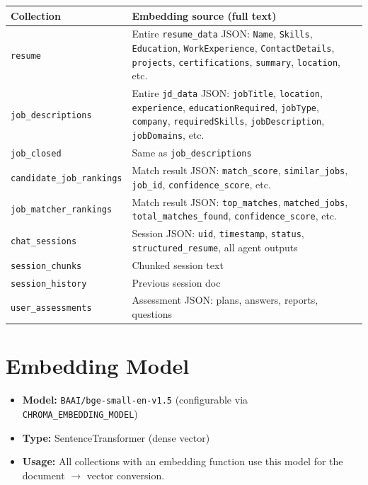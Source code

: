 \documentclass[11pt]{article}
\begin{document}
\begin{table}[h]
\centering
\begin{tabular}{@{}p{3.5cm}p{10cm}@{}}
\toprule
\textbf{Collection} & \textbf{Embedding source (full text)} \\
\midrule
\texttt{resume} & Entire \texttt{resume\_data} JSON: \texttt{Name}, \texttt{Skills}, \texttt{Education}, \texttt{WorkExperience}, \texttt{ContactDetails}, \texttt{projects}, \texttt{certifications}, \texttt{summary}, \texttt{location}, etc. \\
\midrule
\texttt{job\_descriptions} & Entire \texttt{jd\_data} JSON: \texttt{jobTitle}, \texttt{location}, \texttt{experience}, \texttt{educationRequired}, \texttt{jobType}, \texttt{company}, \texttt{requiredSkills}, \texttt{jobDescription}, \texttt{jobDomains}, etc. \\
\midrule
\texttt{job\_closed} & Same as \texttt{job\_descriptions} \\
\midrule
\texttt{candidate\_job\_rankings} & Match result JSON: \texttt{match\_score}, \texttt{similar\_jobs}, \texttt{job\_id}, \texttt{confidence\_score}, etc. \\
\midrule
\texttt{job\_matcher\_rankings} & Match result JSON: \texttt{top\_matches}, \texttt{matched\_jobs}, \texttt{total\_matches\_found}, \texttt{confidence\_score}, etc. \\
\midrule
\texttt{chat\_sessions} & Session JSON: \texttt{uid}, \texttt{timestamp}, \texttt{status}, \texttt{structured\_resume}, all agent outputs \\
\midrule
\texttt{session\_chunks} & Chunked session text \\
\midrule
\texttt{session\_history} & Previous session doc \\
\midrule
\texttt{user\_assessments} & Assessment JSON: plans, answers, reports, questions \\
\bottomrule
\end{tabular}
\end{table}

\section{Embedding Model}

\begin{itemize}
\item \textbf{Model:} \texttt{BAAI/bge-small-en-v1.5} (configurable via \texttt{CHROMA\_EMBEDDING\_MODEL})
\item \textbf{Type:} SentenceTransformer (dense vector)
\item \textbf{Usage:} All collections with an embedding function use this model for the document $\rightarrow$ vector conversion.
\end{itemize}
\end{document}
